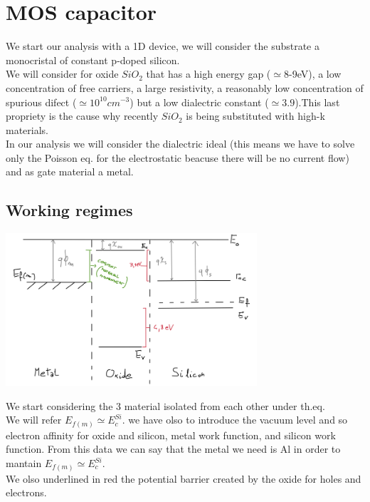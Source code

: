 \chapter{MOS capacitor}
We start our analysis with a 1D device, we will consider the substrate a monocristal of constant p-doped silicon.\\
We will consider for oxide $SiO_{2}$ that has a high energy gap ($\simeq$8-9eV), a low concentration of free carriers, a large resistivity, a reasonably low concentration of spurious difect ($\simeq 10^{10}cm^{-3}$) but a low dialectric constant ($\simeq 3.9$).This last propriety is the cause why recently $SiO_2$ is being substituted with high-k materials.\\
In our analysis we will consider the dialectric ideal (this means we have to solve only the Poisson eq. for the electrostatic beacuse there will be no current flow) and as gate material a metal.\\

\section{Working regimes}

\centering
\includegraphics[width=0.7\textwidth]{mos_separate_material.png}\\
\raggedright

We start considering the 3 material isolated from each other under th.eq.\\
We will refer $E_{f(m)}\simeq E_{c}^{Si}$. we have olso to introduce the vacuum level and so electron affinity for oxide and silicon, metal work function, and silicon work function. From this data we can say that the metal we need is Al in order to mantain $E_{f(m)}\simeq E_{c}^{Si}$.\\
We olso underlined in red the potential barrier created by the oxide for holes and electrons.\\

